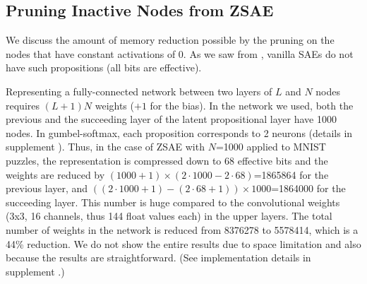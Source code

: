 \subsection{Pruning Inactive Nodes from ZSAE}


We discuss the amount of memory reduction possible by the pruning on the nodes
that have constant activations of 0. As we saw from ,
vanilla SAEs do not have such propositions (all bits are effective).

Representing a fully-connected
network between two layers of $L$ and $N$ nodes requires $(L+1)N$
weights ($+1$ for the bias).
In the network we used,
both the previous and the succeeding layer of the latent propositional layer have 1000 nodes.
In gumbel-softmax, each proposition corresponds to 2 neurons (details in supplement ).
Thus, in the case of ZSAE with $N$=1000 applied to MNIST puzzles,
the representation is compressed down to 68 effective bits and
the weights are reduced by $(1000+1)\times (2\cdot 1000 - 2\cdot 68)$=1865864 for the previous layer,
and $((2\cdot 1000+1)-(2\cdot 68+1))\times 1000 $=1864000 for the succeeding layer.
This number is huge compared to the convolutional weights (3x3, 16 channels, thus 144 float values each) in the upper layers.
The total number of weights in the network is reduced from 8376278 to 5578414, which is a 44\% reduction.
We do not show the entire results due to space limitation and also because the results are straightforward.
(See implementation details in supplement .)


